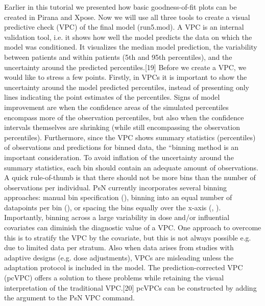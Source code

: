 Earlier in this tutorial we presented how basic goodness-of-fit plots
can be created in Pirana and Xpose. Now we will use all three tools to
create a visual predictive check (VPC) of the final model
(run5.mod). A VPC is an internal validation tool, i.e. it shows how
well the model predicts the data on which the model was
conditioned. It visualizes the median model prediction, the
variability between patients and within patients (5th and 95th
percentiles), and the uncertainty around the predicted
percentiles.[19] Before we create a VPC, we would like to stress a few
points. Firstly, in VPCs it is important to show the uncertainty
around the model predicted percentiles, instead of presenting only
lines indicating the point estimates of the percentiles. Signs of
model improvement are when the confidence areas of the simulated
percentiles encompass more of the observation percentiles, but also
when the confidence intervals themselves are shrinking (while still
encompassing the observation percentiles).  Furthermore, since the VPC
shows summary statistics (percentiles) of observations and predictions
for binned data, the “binning method is an important consideration. To
avoid inflation of the uncertainty around the summary statistics, each
bin should contain an adequate amount of observations. A quick
rule-of-thumb is that there should not be more bins than the number of
observations per individual. PsN currently incorporates several
binning approaches: manual bin specification (),
binning into an equal number of datapoints per bin (), or spacing the bins equally over the x-axis
(, ). Importantly, binning across a large
variability in dose and/or influential covariates can diminish the
diagnostic value of a VPC. One approach to overcome this is to
stratify the VPC by the covariate, but this is not always possible
e.g. due to limited data per stratum. Also when data arises from
studies with adaptive designs (e.g. dose adjustments), VPCs are
misleading unless the adaptation protocol is included in the
model. The prediction-corrected VPC (pcVPC) offers a solution to these
problems while retaining the visual interpretation of the traditional
VPC.[20] pcVPCs can be constructed by adding the argument 
to the PsN VPC command.

